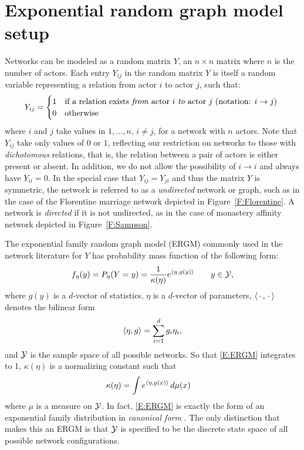 \section{Exponential random graph model setup} \label{S:ERGM setup}
Networks can be modeled as a random matrix $Y$, an $n \times n$ matrix where $n$ is 
the number of actors.
Each entry $Y_{ij}$ in the random matrix $Y$ is itself a random variable representing 
a relation from actor $i$ to actor $j$, such that:
\[
	Y_{ij} = 
	\begin{cases}
		1 & \text{if a relation exists \textit{from} actor $i$ \textit{to} actor 
$j$ (notation: $i \to j$)}\\
		0 & \text{otherwise}
	\end{cases}
	\
\]
where $i$ and $j$ take values in $1, \ldots, n$, $i \neq j$, for a network with $n$ 
actors.  Note that $Y_{ij}$ take only values of $0$ or $1$, reflecting our restriction 
on networks to those with \emph{dichotomous} relations, that is, the relation between a pair 
of actors is either present or absent.  In addition, we do not allow the possibility 
of $i \to i$ and always have $Y_{ii} = 0$.  In the special case that 
$Y_{ij} = Y_{ji}$ and thus the matrix $Y$ is symmetric, the network is referred to as a \textit
{undirected} network or graph, such as in the case of the Florentine marriage network 
depicted in Figure~\ref{F:Florentine}.  A network is \textit{directed} if it is not 
undirected, as in the case of monastery affinity network depicted in 
Figure~\ref{F:Sampson}.  

The exponential family random graph model (ERGM) commonly used in the network 
literature for $Y$ has probability mass function of the following form:
\begin{align}
	f_\eta(y) = P_{\eta}(Y=y) = \frac{1}{ \kappa( \eta) } e^{ \langle  \eta, g(y) \rangle  } \qquad y \in {\mathcal Y}, \label{E:ERGM}
\end{align}
where $g(y)$ is a $d$-vector of statistics, $\eta$ is a $d$-vector of parameters, 
$\langle \,\cdot\,,\,\cdot\, \rangle$ denotes the bilinear form
\begin{align*}
	\langle  \eta, g  \rangle = \sum_{i=1}^d g_i \eta_i,
\end{align*}
and ${\mathcal Y}$ is the sample space of all possible networks.
So that \eqref{E:ERGM} integrates to 1, $\kappa(\eta)$ is a normalizing constant such that
\begin{align}
   \kappa(\eta) &= \int e^{ \langle  \eta, g(x) \rangle  } \, d \mu(x) \label{E:kappa}
\end{align}
where $\mu$ is a measure on ${\mathcal Y}$.  In fact, \eqref{E:ERGM} is exactly the form of 
an exponential family distribution in \emph{canonical form} \citep{tpe}.  The only distinction that makes this an ERGM is that ${\mathcal Y}$ is specified to be the 
discrete state space of all possible network configurations.

